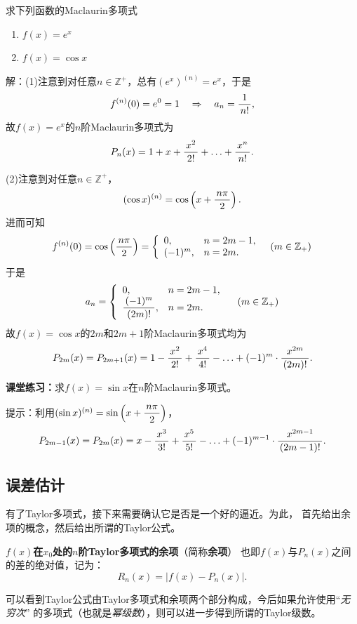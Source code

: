 \bs
\egz 求下列函数的Maclaurin多项式
\begin{enumerate}[(1)]
  \setlength{\itemindent}{1cm}
  \item $f(x)=e^x$ 
  \item $f(x)=\cos x$ 
\end{enumerate}

解：(1)注意到对任意$n\in\mathbb{Z}^+$，总有$(e^x)^{(n)}=e^x$，于是
$$f^{(n)}(0)=e^0=1\quad
\Rightarrow\quad
a_n=\displaystyle\frac{\,{1}\,}{\,{n!}\,},
$$
故$f(x)=e^x$的$n$阶Maclaurin多项式为
$$P_n(x)=1+x+\displaystyle\frac{\,{x^2}\,}{\,{2!}\,}+\ldots+\displaystyle\frac{\,{x^n}\,}{\,{n!}\,}.$$ 

(2)注意到对任意$n\in\mathbb{Z}^+$，
$$(\cos x)^{(n)}=\cos\left(x+\displaystyle\frac{\,{n\pi}\,}{\,{2}\,}\right).$$
进而可知
$$f^{(n)}(0)=\cos\left(\displaystyle\frac{\,{n\pi}\,}{\,{2}\,}\right)=
\left\{
\begin{array}{ll}
	0,& n=2m-1,\\ (-1)^m, & n=2m.
\end{array}
\quad (m\in\mathbb{Z}_+)
\right.$$
于是
$$a_n=\left\{
\begin{array}{ll}
	0,& n=2m-1,\\ \displaystyle\frac{\,{(-1)^m}\,}{\,{(2m)!}\,}, & n=2m.
\end{array}\right.
\quad (m\in\mathbb{Z}_+)$$
故$f(x)=\cos x$的$2m$和$2m+1$阶Maclaurin多项式均为
$$P_{2m}(x)=P_{2m+1}(x)=1-\displaystyle\frac{\,{x^2}\,}{\,{2!}\,}+\displaystyle\frac{\,{x^4}\,}{\,{4!}\,}
-\ldots+(-1)^m\cdot\displaystyle\frac{\,{x^{2m}}\,}{\,{(2m)!}\,}.$$
\fin

{\bf 课堂练习：}求$f(x)=\sin x$在$n$阶Maclaurin多项式。

\ifhint
提示：利用$(\sin x)^{(n)}=\sin\left(x+\displaystyle\frac{\,{n\pi}\,}{\,{2}\,}\right)$，
$$P_{2m-1}(x)=P_{2m}(x)=x-\displaystyle\frac{\,{x^3}\,}{\,{3!}\,}+\displaystyle\frac{\,{x^5}\,}{\,{5!}\,}
-\ldots+(-1)^{m-1}\cdot\displaystyle\frac{\,{x^{2m-1}}\,}{\,{(2m-1)!}\,}.$$
\fi

\subsection{误差估计}

有了Taylor多项式，接下来需要确认它是否是一个好的逼近。为此，
首先给出余项的概念，然后给出所谓的Taylor公式。

\begin{thx}
	{\bf $f(x)$在$x_0$处的$n$阶Taylor多项式的余项}（简称{\bf 余项}）
	也即$f(x)$与$P_n(x)$之间的差的绝对值，记为：
	$$R_n(x)=|f(x)-P_n(x)|.$$ 
\end{thx}



可以看到Taylor公式由Taylor多项式和余项两个部分构成，今后如果允许使用“{\it 无穷次}”
的多项式（也就是{\it 幂级数}），则可以进一步得到所谓的{\kaishu Taylor级数}。



